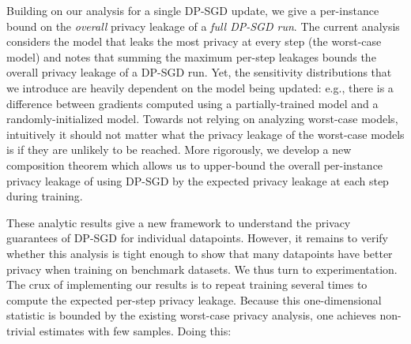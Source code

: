 Building on our analysis for a single DP-SGD update, we give a per-instance bound on the \emph{overall} privacy leakage of a \emph{full DP-SGD run}. The current analysis considers the model that leaks the most privacy at every step (the worst-case model) and notes that summing the maximum per-step leakages bounds the overall privacy leakage of a DP-SGD run. %
Yet, the sensitivity distributions that we introduce are heavily dependent on the model being updated:  e.g., there is a difference between gradients computed using a partially-trained model and a randomly-initialized model. 
Towards not relying on analyzing worst-case models, intuitively it should not matter what the privacy leakage of the worst-case models is if they are  unlikely to be reached. %
More rigorously, we 
develop a new composition theorem
which allows us to upper-bound the overall per-instance privacy leakage of using DP-SGD by the expected privacy leakage at each step during training. 











These analytic results give %
a new framework to understand the privacy guarantees of DP-SGD for individual datapoints. However, it remains to verify whether this analysis is tight enough to show that many datapoints have better privacy when training on benchmark datasets.
We thus turn to experimentation. 
The crux of implementing our results is to repeat training several times to compute the expected per-step privacy leakage. %
Because this one-dimensional statistic is bounded by the existing worst-case privacy analysis, one  achieves non-trivial estimates with few samples.  Doing this:

